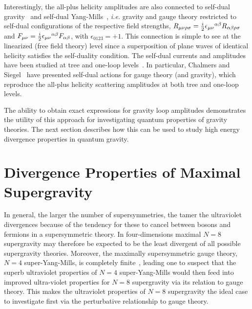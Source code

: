 \documentclass[12pt]{livrev}
\begin{document}
Interestingly, the all-plus helicity amplitudes are also connected to
self-dual gravity~\cite{Plebanski75,Duff79,Plebanski96} and self-dual
Yang-Mills~\cite{Yang77,DuffIsham80,Lenzov87,Lenzov88,Bardeen96,
Cangemi,ChalmersSiegel}, {\it i.e.} gravity and gauge theory
restricted to self-dual configurations of the respective field
strengths, $R_{\mu\nu\rho\sigma} =
{i\over2}\epsilon_{\mu\nu}{}^{\alpha\beta} R_{\alpha\beta \rho\sigma}$
and $F_{\mu\nu} = {i\over 2} \epsilon_{\mu\nu}{}^{\alpha\beta}
F_{\alpha\beta}$, with $\epsilon_{0123} = +1$.  This connection is
simple to see at the linearized (free field theory) level since a
superposition of plane waves of identical helicity satisfies the
self-duality condition.  The self-dual currents and amplitudes have
been studied at tree and one-loop
levels~\cite{DuffIsham80,Bardeen96,Cangemi,ChalmersSiegel}.  In
particular, Chalmers and Siegel~\cite{ChalmersSiegel} have presented
self-dual actions for gauge theory (and gravity), which reproduce the
all-plus helicity scattering amplitudes at both tree and one-loop
levels.

The ability to obtain exact expressions for gravity loop amplitudes
demonstrates the utility of this approach for investigating quantum
properties of gravity theories.  The next section describes how this
can be used to study high energy divergence properties 
in quantum gravity.


\newpage 
\section{Divergence Properties of Maximal Supergravity}
\label{section:divergence_properties}

In general, the larger the number of supersymmetries, the tamer the
ultraviolet divergences because of the tendency for these to cancel
between bosons and fermions in a supersymmetric theory.  In
four-dimensions maximal $N=8$ supergravity may therefore be expected
to be the least divergent of all possible supergravity
theories. Moreover, the maximally supersymmetric gauge theory, $N=4$
super-Yang-Mills, is completely finite~\cite{Stelle81,Mandelstam83,Howe89},
leading one to suspect that the superb ultraviolet properties of $N=4$
super-Yang-Mills would then feed into improved ultra-violet properties
for $N=8$ supergravity via its relation to gauge theory.  This makes
the ultraviolet properties of $N=8$ supergravity the ideal case to
investigate first via the perturbative relationship to gauge theory.
\end{document}
